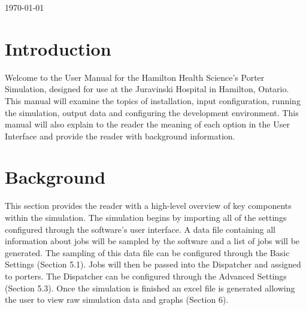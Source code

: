 \documentclass[paper=letter, fontsize=10pt]{scrartcl}
\numberwithin{equation}{section}		%
\numberwithin{figure}{section}			%
\numberwithin{table}{section}				%
\begin{document}
\begin{titlepage}
\begin{center}


{\large \today}\\[3cm] %


 

\vfill %
\end{center}
\end{titlepage}

\setcounter{tocdepth}{2}

\tableofcontents

\newpage
\section{Introduction}
Welcome to the User Manual for the Hamilton Health Science's Porter Simulation, designed for use at the Juravinski Hospital in Hamilton, Ontario. This manual will examine the topics of installation, input configuration, running the simulation, output data and configuring the development environment.  This manual will also explain to the reader the meaning of each option in the User Interface and provide the reader with background information.

\section{Background}
This section provides the reader with a high-level overview of key components within the simulation.  The simulation begins by importing all of the settings configured through the software's user interface.  A data file containing all information about jobs will be sampled by the software and a list of jobs will be generated.  The sampling of this data file can be configured through the Basic Settings (Section 5.1).  Jobs will then be passed into the Dispatcher and assigned to porters.  The Dispatcher can be configured through the Advanced Settings (Section 5.3).  Once the simulation is finished an excel file is generated allowing the user to view raw simulation data and graphs (Section 6).
	
\end{document}
